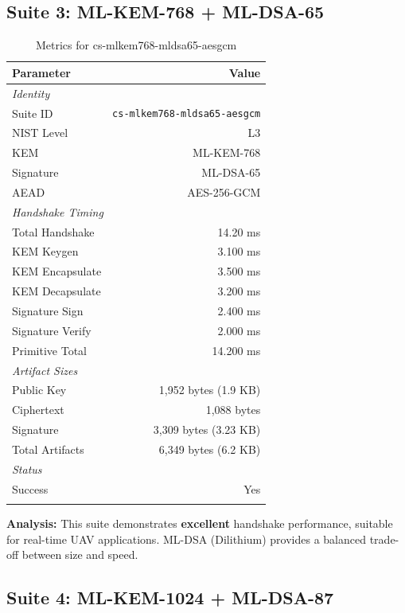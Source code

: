 \documentclass[11pt,a4paper,twoside]{article}
\begin{document}
\subsection{Suite 3: ML-KEM-768 + ML-DSA-65}
\label{suite:cs-mlkem768-mldsa65-aesgcm}

\begin{table}[H]
\centering
\caption{Metrics for cs-mlkem768-mldsa65-aesgcm}
\begin{tabular}{l r}
\toprule
\textbf{Parameter} & \textbf{Value} \\
\midrule
\multicolumn{2}{l}{\textit{Identity}} \\
Suite ID & \texttt{cs-mlkem768-mldsa65-aesgcm} \\
NIST Level & L3 \\
KEM & ML-KEM-768 \\
Signature & ML-DSA-65 \\
AEAD & AES-256-GCM \\
\midrule
\multicolumn{2}{l}{\textit{Handshake Timing}} \\
Total Handshake & 14.20 ms \\
KEM Keygen & 3.100 ms \\
KEM Encapsulate & 3.500 ms \\
KEM Decapsulate & 3.200 ms \\
Signature Sign & 2.400 ms \\
Signature Verify & 2.000 ms \\
Primitive Total & 14.200 ms \\
\midrule
\multicolumn{2}{l}{\textit{Artifact Sizes}} \\
Public Key & 1,952 bytes (1.9 KB) \\
Ciphertext & 1,088 bytes \\
Signature & 3,309 bytes (3.23 KB) \\
Total Artifacts & 6,349 bytes (6.2 KB) \\
\midrule
\multicolumn{2}{l}{\textit{Status}} \\
Success & Yes \\
 \\
\bottomrule
\end{tabular}
\end{table}

\textbf{Analysis:} This suite demonstrates \textbf{excellent} handshake performance, suitable for real-time UAV applications. ML-DSA (Dilithium) provides a balanced trade-off between size and speed. 
\newpage
\subsection{Suite 4: ML-KEM-1024 + ML-DSA-87}
\label{suite:cs-mlkem1024-mldsa87-aesgcm}
\end{document}
